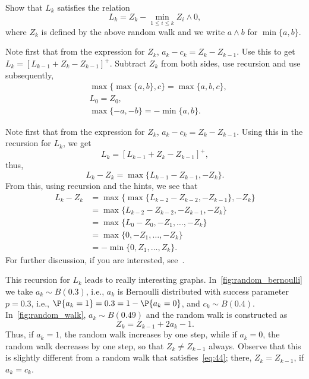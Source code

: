 \begin{exercise}
Show that $L_k$ satisfies the relation
\begin{equation}\label{eq:reich1}
 L_k = Z_k - \min_{1\leq i \leq k} Z_i\wedge 0,
\end{equation}
where $Z_k$ is defined by the above random walk and
we write $a\wedge b$ for $\min\{a,b\}$.
\begin{hint}
Note first that from the expression for $Z_k$,
 $a_k - c_k = Z_k - Z_{k-1}$. Use this to get
 $L_k = [L_{k-1} +Z_k- Z_{k-1}]^+$. Subtract $Z_k$ from both sides, use recursion and
 use subsequently,
\begin{align*}
&\max\{\max\{a,b\}, c\} = \max\{a,b,c\}, \\
&L_0 = Z_0, \\
&\max\{-a, -b \} = -\min\{a,b\}.
\end{align*}
\end{hint}
\begin{solution}
Note first that from the expression
for $Z_k$, $a_k - c_k = Z_k - Z_{k-1}$. Using this in the recursion
for $L_k$, we get
\begin{equation*}
 L_k = [L_{k-1} +Z_k- Z_{k-1}]^+,
\end{equation*}
thus, 
\begin{equation*}
 L_k - Z_{k} = \max\{L_{k-1} - Z_{k-1}, -Z_k\}.
\end{equation*}
From this, using recursion and the hints, we see that
\begin{equation*}
 \begin{split}
 L_k - Z_{k} 
&= \max\{\max\{L_{k-2} - Z_{k-2}, -Z_{k-1}\}, -Z_k\} \\
&= \max\{L_{k-2} - Z_{k-2}, -Z_{k-1}, -Z_k\} \\
&= \max\{L_{0} - Z_{0}, -Z_1, \ldots, -Z_k\} \\
&= \max\{0, -Z_1, \ldots, -Z_k\} \\
&= - \min\{0, Z_1, \ldots, Z_k\}.
 \end{split}
 \end{equation*}
 For further discussion, if you are interested, see~\citet{baccelli88:_sampl_m_m}.
\end{solution}
\end{exercise}

This recursion for $L_k$ leads to really interesting graphs.
In~\cref{fig:random_bernoulli} we take $a_k \sim B(0.3)$, i.e., $a_k$ is Bernoulli distributed with success parameter $p=0.3$, i.e., $\P{a_k = 1} = 0.3 = 1- \P{a_k=0}$, and $c_k \sim B(0.4)$.
In~\cref{fig:random_walk}, $a_k\sim B(0.49)$ and the random walk is constructed as
\begin{equation}\label{eq:51}
 Z_k = Z_{k-1} + 2 a_k -1.
\end{equation}
Thus, if $a_k=1$, the random walk increases by one step, while if $a_k=0$, the random walk decreases by one step, so that $Z_k \neq Z_{k-1}$ always. Observe that this is slightly different from a random walk that satisfies~\cref{eq:44}; there, $Z_{k}=Z_{k-1}$, if $a_k=c_k$.


